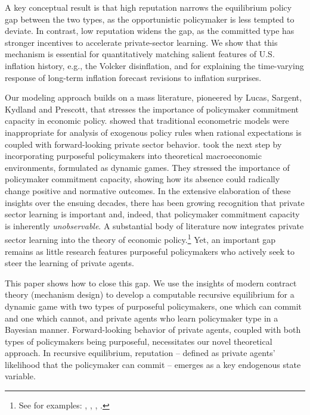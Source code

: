 \documentclass[12pt,letter,leqno]{article}
\theoremstyle{asn}
\theoremstyle{lem}
\theoremstyle{slem}
\theoremstyle{prop}
\theoremstyle{appprop}
\theoremstyle{rem}
\theoremstyle{defn}
\begin{document}
A key conceptual result is that high reputation narrows the equilibrium policy gap between the two types, as the opportunistic policymaker is less tempted to deviate. In contrast, low reputation widens the gap, as the committed type has stronger incentives to accelerate private-sector learning. We show that this mechanism is essential for quantitatively matching salient features of U.S. inflation history, e.g., the Volcker disinflation, and for explaining the time-varying response of long-term inflation forecast revisions to inflation surprises.

Our modeling approach builds on a mass literature, pioneered by Lucas, Sargent, Kydland and Prescott, that stresses the importance of policymaker commitment capacity in economic policy. \cite{lucas_after_1979} showed that traditional econometric models were inappropriate for analysis of exogenous policy rules when rational expectations is coupled with forward-looking private sector behavior. \cite{kydland_rules_1977} took the next step by incorporating purposeful policymakers into theoretical macroeconomic environments, formulated as dynamic games. They stressed the importance of policymaker commitment capacity, showing how its absence could radically change positive and normative outcomes. In the extensive elaboration of these insights over the ensuing decades, there has been growing recognition that private sector learning is important and, indeed, that policymaker commitment capacity is inherently \textit{unobservable}. A substantial body of literature now integrates private sector learning into the theory of economic policy.\footnote{See for examples: \cite{barro_reputation_1986}, \cite{backus_inflation_1985}, \cite{phelan_public_2006}, \cite{dovis_reputation_2022}.} Yet, an important gap remains as little research features purposeful policymakers who actively seek to steer the learning of private agents.

This paper shows how to close this gap. We use the insights of modern contract theory (mechanism design) to develop a computable recursive equilibrium for a dynamic game with two types of purposeful policymakers, one which can commit and one which cannot, and private agents who learn policymaker type in a Bayesian manner. Forward-looking behavior of private agents, coupled with both types of policymakers being purposeful, necessitates our novel theoretical approach. In recursive equilibrium, reputation -- defined as private agents' likelihood that the policymaker can commit -- emerges as a key endogenous state variable. 
\end{document}

